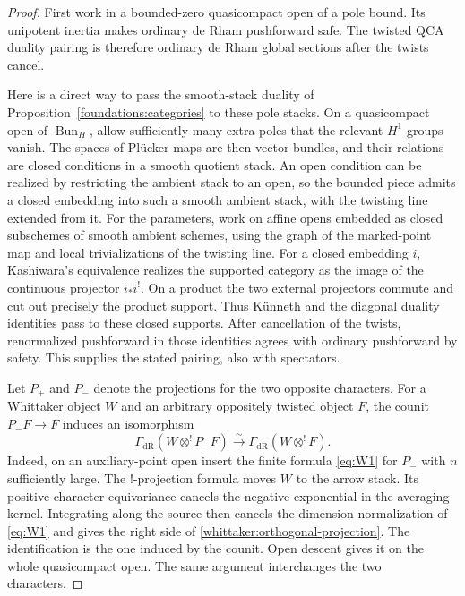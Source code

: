 \begin{proof}
First work in a bounded-zero quasicompact open of a pole bound. Its
unipotent inertia makes ordinary de Rham pushforward safe. The twisted
QCA duality pairing is therefore ordinary de Rham global sections after
the twists cancel.

Here is a direct way to pass the smooth-stack duality of
Proposition~\ref{foundations:categories} to these pole stacks. On a
quasicompact open of $\operatorname{Bun}_H$, allow sufficiently many extra
poles that the relevant $H^1$ groups vanish. The spaces of Pl\"ucker maps
are then vector bundles, and their relations are closed conditions in a
smooth quotient stack. An open condition can be realized by restricting
the ambient stack to an open, so the bounded piece admits a closed
embedding into such a smooth ambient stack, with the twisting line
extended from it. For the parameters, work on affine opens embedded as closed subschemes
of smooth ambient schemes, using the graph of the marked-point map and
local trivializations of the twisting line. For a closed embedding $i$, Kashiwara's equivalence realizes the
supported category as the image of the continuous projector $i_*i^!$.
On a product the two external projectors commute and cut out precisely
the product support. Thus K\"unneth and the diagonal duality identities
pass to these closed supports. After cancellation of the twists,
renormalized pushforward in those identities agrees with ordinary
pushforward by safety. This supplies the stated pairing, also with
spectators.

Let $P_+$ and $P_-$ denote the projections for the two opposite characters.
For a Whittaker object $W$ and an arbitrary oppositely twisted object $F$,
the counit $P_-F\to F$ induces an isomorphism
\begin{equation}\label{whittaker:orthogonal-projection}
 \Gamma_{\mathrm{dR}}(W\otimes^!P_-F)
 \xrightarrow{\ \sim\ }
 \Gamma_{\mathrm{dR}}(W\otimes^!F).
\end{equation}
Indeed, on an auxiliary-point open insert the finite formula
\eqref{eq:W1} for $P_-$ with $n$ sufficiently large. The $!$-projection
formula moves $W$ to the arrow stack. Its positive-character equivariance
cancels the negative exponential in the averaging kernel. Integrating
along the source then cancels the dimension normalization of
\eqref{eq:W1} and gives the right side of
\eqref{whittaker:orthogonal-projection}. The identification is the one
induced by the counit. Open descent gives it on the whole quasicompact
open. The same argument interchanges the two characters.


\end{proof}
